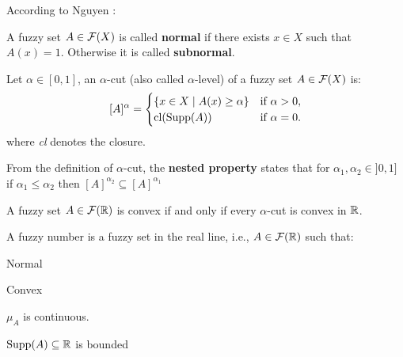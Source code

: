 According to Nguyen :





\begin{definition}
    A fuzzy set $A\in \mathcal{F}(X)$ is called \textbf{normal} if there exists $x\in X$ such that $A(x)=1$. Otherwise it is called \textbf{subnormal}.
\end{definition}

\begin{definition}
    Let $\alpha \in [0,1]$, an $\alpha$-cut (also called $\alpha$-level) of a fuzzy set \( A \in \mathcal{F}(X)\) is:
    \[
    [A]^\alpha =
    \begin{cases}
    \{x \in X \mid A(x)\geq \alpha\} & \text{if } \alpha > 0, \\
    \textnormal{cl}(\textnormal{Supp}(A)) & \text{if } \alpha = 0.
    \end{cases}
    \]
    where \textit{cl} denotes the closure.
\end{definition}

\begin{remark}
    From the definition of $\alpha$-cut, the \textbf{nested property} states that for
    $\alpha_1, \alpha_2 \in ]0,1]$ if $\alpha_1\leq \alpha_2$ then $[A]^{\alpha_2}\subseteq [A]^{\alpha_1}$
\end{remark}

\begin{definition}[Convexity] A fuzzy set $A\in \mathcal{F}(\mathbb{R})$ is convex if and only if every $\alpha$-cut is convex in $\mathbb{R}$.
    
\end{definition}

\begin{definition}
    A fuzzy number is a fuzzy set in the real line, i.e., $A\in \mathcal{F}(\mathbb{R})$ such that:\vspace{-0.9em}
    \begin{romanenum}
        \item Normal\vspace{-0.5em}
        \item Convex\vspace{-0.5em}
        \item $\mu_A$ is continuous.\vspace{-0.5em}
        \item $\textnormal{Supp}(A)\subseteq\mathbb{R}$ is bounded
    \end{romanenum}
    
\end{definition}

